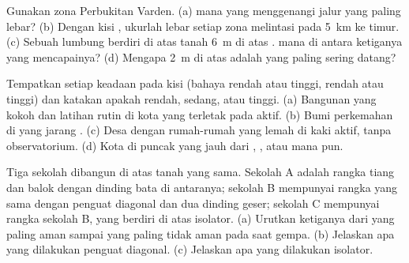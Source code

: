 \begin{exercise}[$\star\star$]\label{exo:g9:natural-risks:6}
Gunakan  zona  Perbukitan Varden. (a)  mana yang
menggenangi jalur yang paling lebar? (b) Dengan kisi , ukurlah lebar
setiap zona melintasi  pada \qty{5}{km} ke timur. (c) Sebuah
lumbung berdiri di atas tanah \qty{6}{m} di atas .  mana di
antara ketiganya yang mencapainya? (d) Mengapa  \qty{2}{m} di atas
 adalah  yang paling sering datang?
\end{exercise}

\begin{exercise}[$\star\star$]\label{exo:g9:natural-risks:7}
Tempatkan setiap keadaan pada kisi  (bahaya rendah atau tinggi,
 rendah atau tinggi) dan katakan apakah  rendah,
sedang, atau tinggi. (a) Bangunan yang kokoh dan latihan rutin di kota
yang terletak pada  aktif. (b) Bumi perkemahan di 
 yang jarang . (c) Desa dengan rumah-rumah yang lemah di kaki
 aktif, tanpa observatorium. (d) Kota di puncak  yang jauh
dari , , atau  mana pun.
\end{exercise}

\begin{exercise}[$\star\star$]\label{exo:g9:natural-risks:8}
Tiga sekolah dibangun di atas tanah yang sama. Sekolah A adalah rangka
tiang dan balok dengan dinding bata di antaranya; sekolah B mempunyai
rangka yang sama dengan penguat diagonal dan dua dinding geser; sekolah C
mempunyai rangka sekolah B, yang berdiri di atas isolator. (a) Urutkan
ketiganya dari yang paling aman sampai yang paling tidak aman pada saat
gempa. (b) Jelaskan apa yang dilakukan penguat diagonal. (c) Jelaskan apa
yang dilakukan isolator.
\end{exercise}

